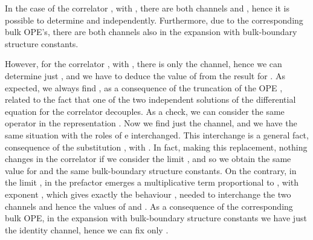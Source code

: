 \documentclass[a4paper,12pt]{report}
\begin{document}
\vspace{0.5cm}


In the case of the correlator \myHighlight{$\langle\sigma\sigma\rangle_{\alpha}$}\coordHE{}, with \coordHE{}, there
are both channels \coordHE{} and \coordHE{}, hence it is possible to determine \coordHE{} and \coordHE{} independently. Furthermore,
due to the corresponding bulk OPE's, there are both channels also in the expansion with bulk-boundary structure
constants.


However, for the correlator \myHighlight{$\langle\varepsilon\sigma\rangle_{\alpha}$}\coordHE{}, with \coordHE{}, there is only the \coordHE{} channel, hence we can determine just \coordHE{}, and we have to deduce the
value of \coordHE{} from the result for \coordHE{}. As expected, we always find \coordHE{}, as a consequence of the truncation of
the OPE \myHighlight{$\; \sigma\times\varepsilon=\sigma$}\coordHE{}, related to the fact that one of the two independent solutions of the
differential equation for the correlator decouples. As a check, we can consider the same operator in the
representation \coordHE{}. Now we find just the \coordHE{} channel, and we have the same situation with the roles
of \coordHE{} e \coordHE{} interchanged. This interchange is a general fact, consequence of the substitution \coordHE{}, with \coordHE{}. In fact, making this
replacement, nothing changes in the correlator if we consider the limit \coordHE{}, and so we obtain
the same value for \coordHE{} and the same bulk-boundary structure constants. On the contrary, in the limit \coordHE{}, in the prefactor emerges a multiplicative term proportional to \myHighlight{$\eta $}\coordHE{}, with exponent \coordHE{}, which gives exactly the behaviour
\coordHE{}, needed to interchange the two channels and hence the
values of \coordHE{} and \coordHE{}. As a consequence of the corresponding bulk OPE, in the expansion with bulk-boundary
structure constants we have just the identity channel, hence we can fix only \coordHE{}.
\end{document}
